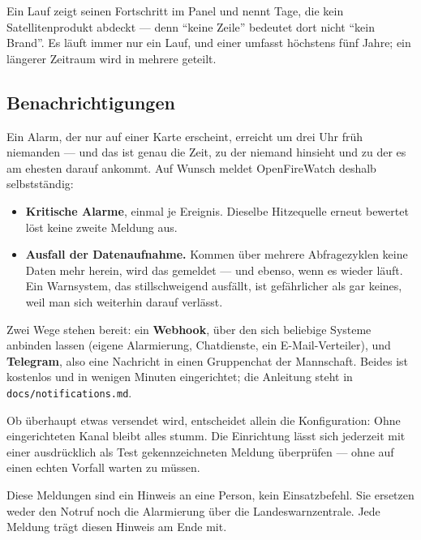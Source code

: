 \documentclass[11pt,a4paper,DIV=12,parskip=half]{scrartcl}
\begin{document}
Ein Lauf zeigt seinen Fortschritt im Panel und nennt Tage, die kein
Satellitenprodukt abdeckt --- denn \enquote{keine Zeile} bedeutet dort nicht
\enquote{kein Brand}. Es läuft immer nur ein Lauf, und einer umfasst höchstens
fünf Jahre; ein längerer Zeitraum wird in mehrere geteilt.

\subsection{Benachrichtigungen}\label{sec:benachrichtigungen}

Ein Alarm, der nur auf einer Karte erscheint, erreicht um drei Uhr früh
niemanden --- und das ist genau die Zeit, zu der niemand hinsieht und zu der
es am ehesten darauf ankommt. Auf Wunsch meldet OpenFireWatch deshalb
selbstständig:

\begin{itemize}[leftmargin=*]
  \item \textbf{Kritische Alarme}, einmal je Ereignis. Dieselbe Hitzequelle
        erneut bewertet löst keine zweite Meldung aus.
  \item \textbf{Ausfall der Datenaufnahme.} Kommen über mehrere Abfragezyklen
        keine Daten mehr herein, wird das gemeldet --- und ebenso, wenn es
        wieder läuft. Ein Warnsystem, das stillschweigend ausfällt, ist
        gefährlicher als gar keines, weil man sich weiterhin darauf verlässt.
\end{itemize}

Zwei Wege stehen bereit: ein \textbf{Webhook}, über den sich beliebige
Systeme anbinden lassen (eigene Alarmierung, Chatdienste, ein
E-Mail-Verteiler), und \textbf{Telegram}, also eine Nachricht in einen
Gruppenchat der Mannschaft. Beides ist kostenlos und in wenigen Minuten
eingerichtet; die Anleitung steht in \texttt{docs/notifications.md}.

Ob überhaupt etwas versendet wird, entscheidet allein die Konfiguration: Ohne
eingerichteten Kanal bleibt alles stumm. Die Einrichtung lässt sich jederzeit
mit einer ausdrücklich als Test gekennzeichneten Meldung überprüfen --- ohne
auf einen echten Vorfall warten zu müssen.

\begin{warnung}
Diese Meldungen sind ein Hinweis an eine Person, kein Einsatzbefehl. Sie
ersetzen weder den Notruf noch die Alarmierung über die Landeswarnzentrale.
Jede Meldung trägt diesen Hinweis am Ende mit.
\end{warnung}
\end{document}

